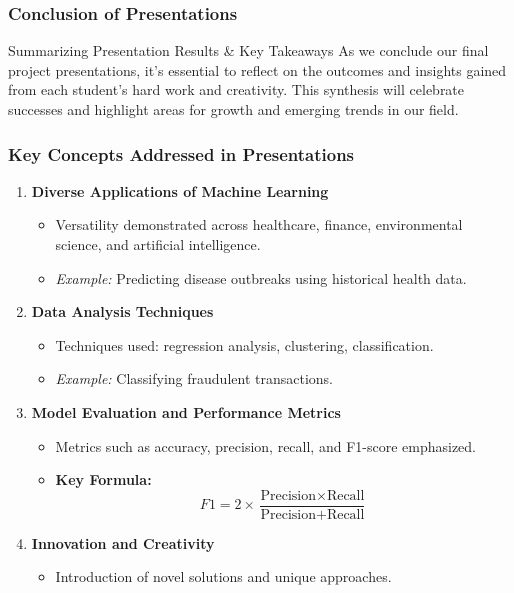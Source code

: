 \documentclass[aspectratio=169]{beamer}
\begin{document}
\begin{frame}[fragile]
    \frametitle{Conclusion of Presentations}
    \begin{block}{Summarizing Presentation Results \& Key Takeaways}
        As we conclude our final project presentations, it's essential to reflect on the outcomes and insights gained from each student’s hard work and creativity. 
        This synthesis will celebrate successes and highlight areas for growth and emerging trends in our field.
    \end{block}
\end{frame}

\begin{frame}[fragile]
    \frametitle{Key Concepts Addressed in Presentations}
    \begin{enumerate}
        \item \textbf{Diverse Applications of Machine Learning}
            \begin{itemize}
                \item Versatility demonstrated across healthcare, finance, environmental science, and artificial intelligence.
                \item \textit{Example:} Predicting disease outbreaks using historical health data.
            \end{itemize}
        
        \item \textbf{Data Analysis Techniques}
            \begin{itemize}
                \item Techniques used: regression analysis, clustering, classification.
                \item \textit{Example:} Classifying fraudulent transactions.
            \end{itemize}
        
        \item \textbf{Model Evaluation and Performance Metrics}
            \begin{itemize}
                \item Metrics such as accuracy, precision, recall, and F1-score emphasized.
                \item \textbf{Key Formula:}
                \begin{equation}
                    F1 = 2 \times \frac{\text{Precision} \times \text{Recall}}{\text{Precision} + \text{Recall}}
                \end{equation}
            \end{itemize}
        
        \item \textbf{Innovation and Creativity}
            \begin{itemize}
                \item Introduction of novel solutions and unique approaches.
            \end{itemize}
    \end{enumerate}
\end{frame}
\end{document}
